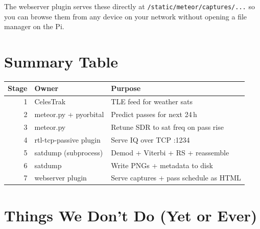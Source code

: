 \documentclass[11pt,a4paper]{article}
\begin{document}
The webserver plugin serves these directly at
\texttt{/static/meteor/captures/...} so you can browse them from
any device on your network without opening a file manager on the
Pi.

\section{Summary Table}

\begin{center}
\begin{tabular}{@{}rll@{}}
\toprule
\textbf{Stage} & \textbf{Owner}                  & \textbf{Purpose} \\
\midrule
1 & CelesTrak                     & TLE feed for weather sats \\
2 & meteor.py + pyorbital        & Predict passes for next 24\,h \\
3 & meteor.py                    & Retune SDR to sat freq on pass rise \\
4 & rtl-tcp-passive plugin       & Serve IQ over TCP :1234 \\
5 & satdump (subprocess)         & Demod + Viterbi + RS + reassemble \\
6 & satdump                      & Write PNGs + metadata to disk \\
7 & webserver plugin             & Serve captures + pass schedule as HTML \\
\bottomrule
\end{tabular}
\end{center}

\section{Things We Don't Do (Yet or Ever)}
\end{document}
